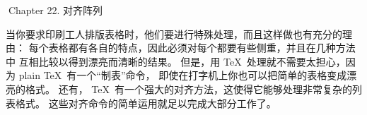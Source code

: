 


\beginchapter Chapter 22. 对齐阵列


\1当你要求印刷工人排版表格时，他们要进行特殊处理，而且这样做也有充分的理由：
每个表格都有各自的特点，因此必须对每个都要有些侧重，并且在几种方法中%
互相比较以得到漂亮而清晰的结果。%
但是，用 \TeX\ 处理就不需要太担心，因为 plain \TeX\ 有一个``制表''命令，
即使在打字机上你也可以把简单的表格变成漂亮的格式。%
还有， \TeX\ 有一个强大的对齐方法，这使得它能够处理非常复杂的列表格式。%
这些对齐命令的简单运用就足以完成大部分工作了。

